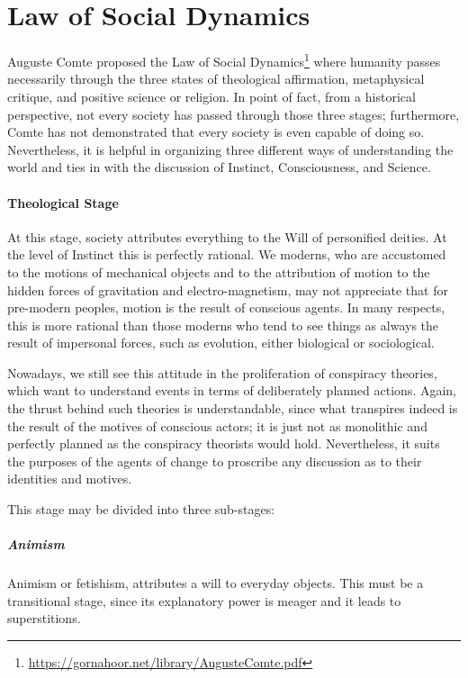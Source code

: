 \section{Law of Social Dynamics}

Auguste Comte proposed the Law of Social Dynamics\footnote{\url{https://gornahoor.net/library/AugusteComte.pdf}} where humanity passes necessarily through the three states of theological affirmation, metaphysical critique, and positive science or religion. In point of fact, from a historical perspective, not every society has passed through those three stages; furthermore, Comte has not demonstrated that every society is even capable of doing so. Nevertheless, it is helpful in organizing three different ways of understanding the world and ties in with the discussion of Instinct, Consciousness, and Science.

\paragraph{Theological Stage}


At this stage, society attributes everything to the Will of personified deities. At the level of Instinct this is perfectly rational. We moderns, who are accustomed to the motions of mechanical objects and to the attribution of motion to the hidden forces of gravitation and electro-magnetism, may not appreciate that for pre-modern peoples, motion is the result of conscious agents. In many respects, this is more rational than those moderns who tend to see things as always the result of impersonal forces, such as evolution, either biological or sociological.

Nowadays, we still see this attitude in the proliferation of conspiracy theories, which want to understand events in terms of deliberately planned actions. Again, the thrust behind such theories is understandable, since what transpires indeed is the result of the motives of conscious actors; it is just not as monolithic and perfectly planned as the conspiracy theorists would hold. Nevertheless, it suits the purposes of the agents of change to proscribe any discussion as to their identities and motives.

This stage may be divided into three sub-stages:

\subparagraph{Animism}


Animism or fetishism, attributes a will to everyday objects. This must be a transitional stage, since its explanatory power is meager and it leads to superstitions.

